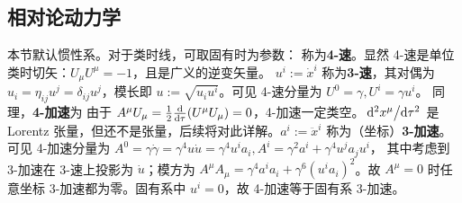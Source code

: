 \subsection{相对论动力学}

本节默认惯性系。对于类时线，可取固有时为参数：
称为\textbf{4-速}。显然 4-速是单位类时切矢：$U_\mu U^\mu=-1$，且是广义的逆变矢量。
$u^i:=\dot{x}^i$ 称为\textbf{3-速}，其对偶为 $u_i=\eta_{ij}u^j=\delta_{ij}u^j$，模长即 $u:=\sqrt{u_i u^i}$。可见 4-速分量为 $U^0=\gamma,U^i=\gamma u^i$。
同理，\textbf{4-加速}为
由于 $A^\mu U_\mu=\frac 12 \dv{\tau}(U^\mu U_\mu)=0$，4-加速一定类空。$\dv*[2]{x^\mu}{\tau}$ 是 Lorentz 张量，但还不是张量，后续将对此详解。$a^i:=\ddot{x}^i$ 称为（坐标）\textbf{3-加速}。
可见 4-加速分量为 $A^0=\gamma \dot{\gamma}=\gamma^4 u\dot{u}=\gamma^4 u^ia_i, A^i=\gamma^2 a^i+\gamma^4 u^ja_j u^i$，
其中考虑到 3-加速在 3-速上投影为 $\dot{u}$；模方为 $A^\mu A_\mu=\gamma^4 a^ia_i+\gamma^6(u^ia_i)^2$。故 $A^\mu=0$ 时任意坐标 3-加速都为零。固有系中 $u^i=0$，故 4-加速等于固有系 3-加速。

